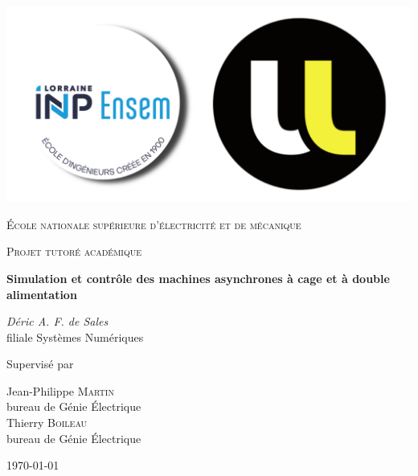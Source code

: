 \begin{titlepage}

\thispagestyle{empty}
\setlength\headheight{0pt} 
\begin{center}

\begin{center}
\includegraphics[width=0.40\linewidth]{img/ENSEM-logo.png}     

\end{center}	

        \vspace{0.25cm}
        {\scshape\LARGE École nationale supérieure d’électricité et de mécanique \par}
        \vspace{0.25cm}
        {\scshape\Large Projet tutoré académique\par}
        \vspace{0.5cm}

        {\Large\bfseries Simulation et contrôle des machines asynchrones à cage et à double alimentation\par}
        
        \vspace{1.5cm}
        {\Large\itshape Déric A. F. de Sales}\\
         filiale Systèmes Numériques
        \vspace{0.25cm}

\vspace{1cm}
Supervisé par\par
Jean-Philippe \textsc{Martin} \\
bureau de Génie Électrique \\
Thierry \textsc{Boileau} \\
bureau de Génie Électrique
\par
\vspace{3.5cm}
\large
\today

\end{center}

\clearpage
\restoregeometry
\end{titlepage}

